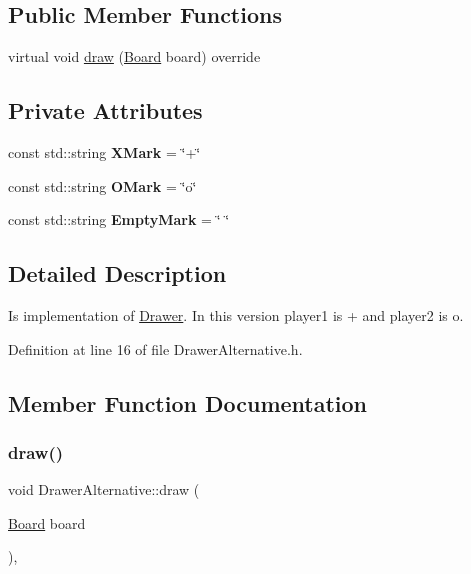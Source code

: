 \subsection*{Public Member Functions}
\begin{DoxyCompactItemize}
\item 
virtual void \hyperlink{classDrawerAlternative_a2d56b61df9a3878c9aa24db5896578ba}{draw} (\hyperlink{classBoard}{Board} board) override
\end{DoxyCompactItemize}
\subsection*{Private Attributes}
\begin{DoxyCompactItemize}
\item 
\mbox{\label{classDrawerAlternative_a58688e22709b37e5fdcf4ce5d5a73b96}} 
const std\+::string {\bfseries X\+Mark} = \char`\"{}+\char`\"{}
\item 
\mbox{\label{classDrawerAlternative_a4f80da586b01bab01119d2a76fe39a95}} 
const std\+::string {\bfseries O\+Mark} = \char`\"{}o\char`\"{}
\item 
\mbox{\label{classDrawerAlternative_a11d00e3321f98034af61d70f570b19aa}} 
const std\+::string {\bfseries Empty\+Mark} = \char`\"{} \char`\"{}
\end{DoxyCompactItemize}


\subsection{Detailed Description}
Is implementation of \hyperlink{classDrawer}{Drawer}. In this version player1 is + and player2 is o. 

Definition at line 16 of file Drawer\+Alternative.\+h.



\subsection{Member Function Documentation}
\mbox{\label{classDrawerAlternative_a2d56b61df9a3878c9aa24db5896578ba}} 
\subsubsection{\texorpdfstring{draw()}{draw()}}
{\footnotesize\ttfamily void Drawer\+Alternative\+::draw (\begin{DoxyParamCaption}\item[{\hyperlink{classBoard}{Board}}]{board }\end{DoxyParamCaption})\hspace{0.3cm}{\ttfamily [override]}, {\ttfamily [virtual]}}

